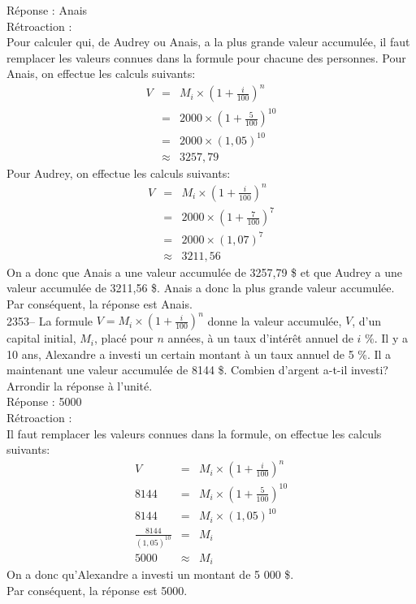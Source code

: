 \documentclass[letterpaper, 12pt]{article}
\begin{document}
R\'eponse : Anais\\

R\'etroaction :\\
Pour calculer qui, de Audrey ou Anais, a la plus grande valeur accumul\'ee, il faut remplacer les valeurs connues dans la formule pour chacune des personnes. Pour Anais, on effectue les calculs suivants:
\begin{eqnarray*}
 V&=&M_{i}\times\left( 1+\frac{i}{100}\right) ^{n}\\[2mm]
&=&2000\times\left( 1+\frac{5}{100}\right) ^{10}\\[2mm]
&=&2000\times\left( 1,05\right) ^{10}\\[2mm]
&\approx&3257,79
\end{eqnarray*}
Pour Audrey, on effectue les calculs suivants:
\begin{eqnarray*}
 V&=&M_{i}\times\left( 1+\frac{i}{100}\right) ^{n}\\[2mm]
&=&2000\times\left( 1+\frac{7}{100}\right) ^{7}\\[2mm]
&=&2000\times\left( 1,07\right) ^{7}\\[2mm]
&\approx&3211,56
\end{eqnarray*}
On a donc que Anais a une valeur accumul\'ee de 3257,79 \$ et que Audrey a une valeur accumul\'ee de 3211,56 \$. Anais a donc la plus grande valeur accumul\'ee.\\
Par cons\'equent, la r\'eponse est Anais.\\

2353-- La formule $V=M_{i}\times(1+\frac{i}{100})^{n}$ donne la valeur accumul\'ee, $V$, d'un capital initial, $M_{i}$, plac\'e pour $n$ ann\'ees, \`a un taux d'int\'er\^et annuel de $i$ \%. Il y a 10 ans, Alexandre a investi un certain montant \`a un taux annuel de 5 \%. Il a maintenant une valeur accumul\'ee de 8144 \$. Combien d'argent a-t-il investi? Arrondir la r\'eponse \`a l'unit\'e.\\

R\'eponse : 5000\\

R\'etroaction :\\
Il faut remplacer les valeurs connues dans la formule, on effectue les calculs suivants:
\begin{eqnarray*}
 V&=&M_{i}\times\left( 1+\frac{i}{100}\right) ^{n}\\[2mm]
8144&=&M_{i}\times\left( 1+\frac{5}{100}\right) ^{10}\\[2mm]
8144&=&M_{i}\times\left( 1,05\right) ^{10}\\[2mm]
\frac{8144}{(1,05)^{10}}&=&M_{i}\\[2mm]
5000&\approx&M_{i}
\end{eqnarray*}
On a donc qu'Alexandre a investi un montant de 5 000 \$. \\
Par cons\'equent, la r\'eponse est 5000.\\
\end{document}
